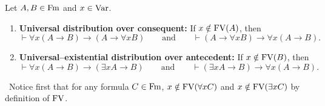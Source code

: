 \documentclass[10pt,a4paper]{article}
\begin{document}
\begin{theorem}\label{thm:quant_dist}
Let $A, B \in {\textrm{Fm}}$ and $x \in {\textrm{Var}}$.
\begin{enumerate}
\item \textbf{Universal distribution over consequent:} If $x \notin {\textrm{FV}}(A)$, then
$$\vdash \forall x (A \to B) \to (A \to \forall x B) \qquad \text{and} \qquad \vdash (A \to \forall x B) \to \forall x (A \to B).$$
\item \textbf{Universal--existential distribution over antecedent:} If $x \notin {\textrm{FV}}(B)$, then
$$\vdash \forall x (A \to B) \to (\exists x A \to B) \qquad \text{and} \qquad \vdash (\exists x A \to B) \to \forall x (A \to B).$$
\end{enumerate}
\end{theorem}
\myprf\ Notice first that for any formula $C \in {\textrm{Fm}}$, $x \notin {\textrm{FV}}(\forall x C)$ and $x \notin {\textrm{FV}}(\exists x C)$ by definition of ${\textrm{FV}}$.
\end{document}
